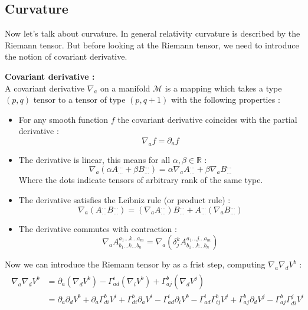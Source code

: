 \documentclass[a4paper,12pt]{article}
\theoremstyle{definition}
\begin{document}
\subsection{Curvature}
Now let's talk about curvature. In general relativity curvature is described by the Riemann tensor.
But before looking at the Riemann tensor, we need to introduce the notion of covariant derivative.
\begin{definition}
	\textbf{Covariant derivative :}\\
	A covariant derivative $\nabla_a$ on a manifold $\mathcal{M}$ is a mapping which takes a type $(p,q)$ tensor to a tensor of type $(p,q+1)$ with the following properties :
	\begin{itemize}
		\item For any smooth function $f$ the covariant derivative coincides with the partial derivative :
		\begin{equation}
			\nabla_af=\partial_af
		\end{equation}
		\item The derivative is linear, this means for all $\alpha,\beta \in \mathbb{R}$ :
		\begin{equation}
			\nabla_a(\alpha A^{...}_{...}+\beta B^{...}_{...})=\alpha \nabla_a A^{...}_{...}+\beta\nabla_a B^{...}_{...}
		\end{equation}
		Where the dots indicate tensors of arbitrary rank of the same type.
		\item The derivative satisfies the Leibniz rule (or product rule) :
		\begin{equation}
			\nabla_a(A^{...}_{...}B^{...}_{...})=(\nabla_aA^{...}_{...})B^{...}_{...}+A^{...}_{...}(\nabla_aB^{...}_{...})
		\end{equation}
		\item The derivative commutes with contraction :
		\begin{equation}
			\nabla_aA^{a_1...k...a_m}_{b_1...k...b_n}=\nabla_a(\delta^k_jA^{a_1...j...a_m}_{b_1...k...b_n})
		\end{equation}
	\end{itemize}
\end{definition}
Now we can introduce the Riemann tensor by as a frist step, computing $\nabla _a \nabla _d V^b$ :
\begin{align}
\begin{split}
	\nabla _a \nabla _d V^b &= \partial_a(\nabla _d V^b)-\Gamma^i_{ad} (\nabla _i V^b)+\Gamma^b_{aj} (\nabla _d V^j)\\
	&=\partial_a\partial_d V^b+ \partial_a \Gamma^b_{di}V^i+ \Gamma^b_{di}\partial_a V^i - \Gamma^i_{ad}\partial_i V^b
	-\Gamma^i_{ad}\Gamma^b_{ij}V^j+\Gamma^b_{aj}\partial_d V^j-\Gamma^b_{aj}\Gamma^j_{di}V^i
\end{split}
\end{align}
\end{document}
